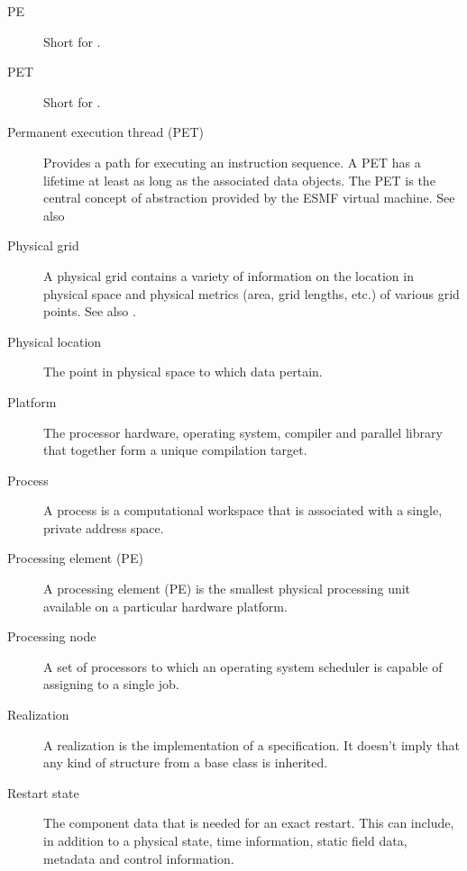 \begin{description}
\item[PE] \label{glos:PE} Short for .

\item[PET] \label{glos:PET} Short for 
  .

\item[Permanent execution thread (PET)] \label{glos:PermET} Provides a
  path for executing an instruction sequence. A PET has a lifetime at least 
  as long as the associated data objects. The PET is the central concept of
  abstraction provided by the ESMF virtual machine. See also  

\item[Physical grid] \label{term:PhysGrid} 
  A physical grid contains a variety of information on the location 
  in physical space and physical metrics (area, grid lengths, etc.) 
  of various grid points. See also . 

\item[Physical location] \label{glos:PhysLoc} The point in physical space 
  to which data pertain. 

\item[Platform] \label{glos:Platform} 
  The processor hardware, operating system, compiler and
  parallel library that together form a unique compilation target.

\item[Process] \label{glos:Process}
  A process is a computational workspace that is associated with a single,
  private address space.

\item[Processing element (PE)] \label{glos:Processing_Element}
  A processing element (PE) is the smallest physical processing unit available
  on a particular hardware platform.

\item[Processing node] \label{glos:Pnode} A set of processors to which an
  operating system scheduler is capable of assigning to a single job.

\item[Realization] \label{glos:Realization} A realization is the 
  implementation of a specification.  It doesn't imply that any kind
  of structure from a base class is inherited.

\item[Restart state] \label{glos:RestartState} The component 
  data that is needed for an exact restart. This can include, 
  in addition to a physical state, time information, static field data,
  metadata and control information. 


\end{description}
